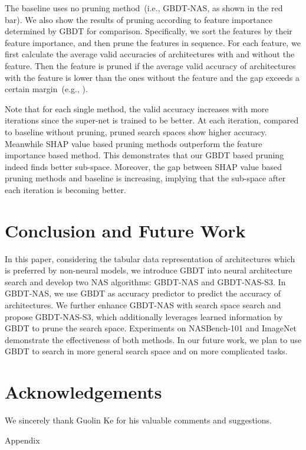 \documentclass{article}
\begin{document}
The baseline uses no pruning method~(i.e., GBDT-NAS, as shown in the red bar). We also show the results of pruning according to feature importance determined by GBDT for comparison. Specifically, we sort the features by their feature importance, and then prune the features in sequence. For each feature, we first calculate the average valid accuracies of architectures with and without the feature. Then the feature is pruned if the average valid accuracy of architectures with the feature is lower than the ones without the feature and the gap exceeds a certain margin~(e.g., ). 

Note that for each single method, the valid accuracy increases with more iterations since the super-net is trained to be better. At each iteration, compared to baseline without pruning, pruned search spaces show higher accuracy. Meanwhile SHAP value based pruning methods outperform the feature importance based method.  This demonstrates that our GBDT based pruning indeed finds better sub-space. Moreover, the gap between SHAP value based pruning methods and baseline is increasing, implying that the sub-space after each iteration is becoming better.

\section{Conclusion and Future Work}
In this paper, considering the tabular data representation of architectures which is preferred by non-neural models, we introduce GBDT into neural architecture search and develop two NAS algorithms: GBDT-NAS and GBDT-NAS-S3. In GBDT-NAS, we use GBDT as accuracy predictor to predict the accuracy of architectures. We further enhance GBDT-NAS with search space search and propose GBDT-NAS-S3, which additionally leverages learned information by GBDT to prune the search space. Experiments on NASBench-101 and ImageNet demonstrate the effectiveness of both methods. In our future work, we plan to use GBDT to search in more general search space and on more complicated tasks.

\section*{Acknowledgements}
We sincerely thank Guolin Ke for his valuable comments and suggestions.





\clearpage
\centerline{\Huge{Appendix}}
\end{document}
